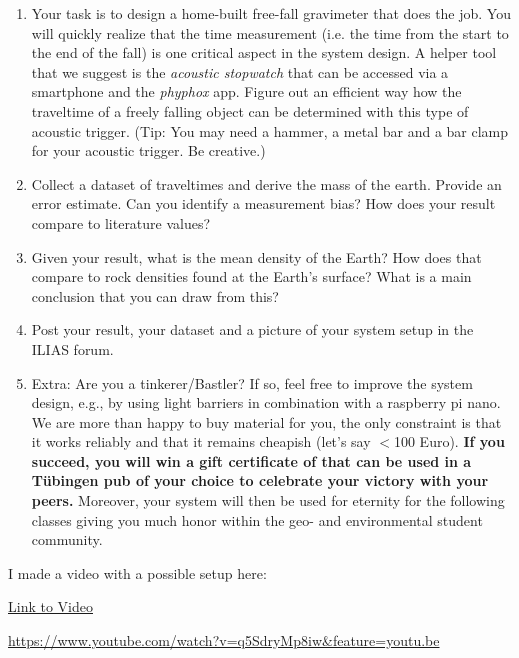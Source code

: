   \begin{enumerate}[label=(\alph*)]
    \item Your task is to design a home-built free-fall gravimeter that does the job. You will quickly realize that the time measurement (i.e. the time from the start to the end of the fall) is one critical aspect in the system design. A helper tool that we suggest is the \textit{acoustic stopwatch} that can be accessed via a smartphone and the \textit{phyphox} app. Figure out an efficient way how the traveltime of a freely falling object can be determined with this type of acoustic trigger. (Tip: You may need a hammer, a metal bar and a bar clamp for your acoustic trigger. Be creative.)
    
    \item Collect a dataset of traveltimes and derive the mass of the earth. Provide an error estimate. Can you identify a measurement bias? How does your result compare to literature values? 
    
    \item Given your result, what is the mean density of the Earth? How does that compare to rock densities found at the Earth's surface? What is a main conclusion that you can draw from this?

    \item Post your result, your dataset and a picture of your system setup in the ILIAS forum. 

    \item Extra: Are you a tinkerer/Bastler? If so, feel free to improve the system design, e.g., by using light barriers in combination with a raspberry pi nano. We are more than happy to buy material for you, the only constraint is that it works reliably and that it remains cheapish (let's say $<$100 Euro). \textbf{If you succeed, you will win a gift certificate of that can be used in a Tübingen pub of your choice to celebrate your victory with your peers.} Moreover, your system will then be used for eternity for the following classes giving you much honor within the geo- and environmental student community.
  \end{enumerate}
  \ifanswers
            \begin{tcolorbox}[enhanced jigsaw,breakable,pad at break*=1mm,
                colback=blue!5!white,colframe=babyblueeyes,title=Solutions,
                watermark color=white]
                I made a video with a possible setup here: 
                \begin{center}
                    \href{https://www.youtube.com/watch?v=q5SdryMp8iw&feature=youtu.be}{Link to Video} 
                \end{center}
                \url{https://www.youtube.com/watch?v=q5SdryMp8iw&feature=youtu.be}
            \end{tcolorbox}
  \fi